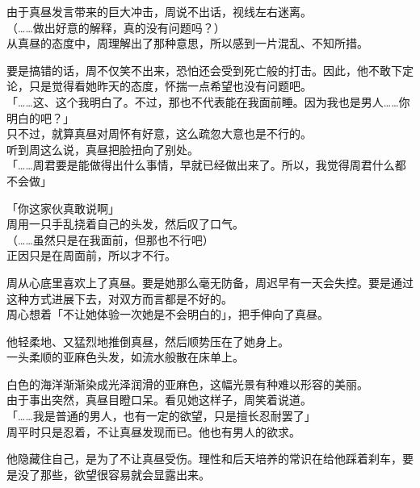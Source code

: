 由于真昼发言带来的巨大冲击，周说不出话，视线左右迷离。\\

（……做出好意的解释，真的没有问题吗？）\\

从真昼的态度中，周理解出了那种意思，所以感到一片混乱、不知所措。

要是搞错的话，周不仅笑不出来，恐怕还会受到死亡般的打击。因此，他不敢下定论，只是觉得看她昨天的态度，怀揣一点希望也没有问题吧。\\

「……这、这个我明白了。不过，那也不代表能在我面前睡。因为我也是男人……你明白的吧？」\\

只不过，就算真昼对周怀有好意，这么疏忽大意也是不行的。\\

听到周这么说，真昼把脸扭向了别处。\\

「……周君要是能做得出什么事情，早就已经做出来了。所以，我觉得周君什么都不会做」

「你这家伙真敢说啊」\\

周用一只手乱挠着自己的头发，然后叹了口气。\\

（……虽然只是在我面前，但那也不行吧）\\

正因只是在周面前，所以才不行。

周从心底里喜欢上了真昼。要是她那么毫无防备，周迟早有一天会失控。要是通过这种方式进展下去，对双方而言都是不好的。\\

周心想着「不让她体验一次她是不会明白的」，把手伸向了真昼。

他轻柔地、又猛烈地推倒真昼，然后顺势压在了她身上。\\

一头柔顺的亚麻色头发，如流水般散在床单上。

白色的海洋渐渐染成光泽润滑的亚麻色，这幅光景有种难以形容的美丽。\\

由于事出突然，真昼目瞪口呆。看见她这样子，周笑着说道。\\

「……我是普通的男人，也有一定的欲望，只是擅长忍耐罢了」\\

周平时只是忍着，不让真昼发现而已。他也有男人的欲求。

他隐藏住自己，是为了不让真昼受伤。理性和后天培养的常识在给他踩着刹车，要是没了那些，欲望很容易就会显露出来。\\

